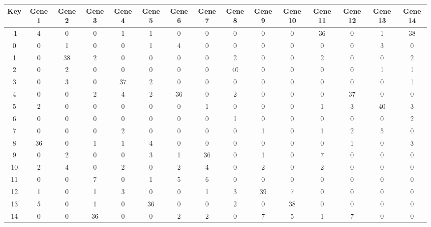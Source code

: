 \begin{tabular}{|c|c|c|c|c|c|c|c|c|c|c|c|c|c|c|}
\hline
Key & Gene 1 & Gene 2 & Gene 3 & Gene 4 & Gene 5 & Gene 6 & Gene 7 & Gene 8 & Gene 9 & Gene 10 & Gene 11 & Gene 12 & Gene 13 & Gene 14 \\
\hline
-1 & 4 & 0 & 0 & 1 & 1 & 0 & 0 & 0 & 0 & 0 & 36 & 0 & 1 & 38 \\
0 & 0 & 1 & 0 & 0 & 1 & 4 & 0 & 0 & 0 & 0 & 0 & 0 & 3 & 0 \\
1 & 0 & 38 & 2 & 0 & 0 & 0 & 0 & 2 & 0 & 0 & 2 & 0 & 0 & 2 \\
2 & 0 & 2 & 0 & 0 & 0 & 0 & 0 & 40 & 0 & 0 & 0 & 0 & 1 & 1 \\
3 & 0 & 3 & 0 & 37 & 2 & 0 & 0 & 0 & 0 & 0 & 0 & 0 & 0 & 1 \\
4 & 0 & 0 & 2 & 4 & 2 & 36 & 0 & 2 & 0 & 0 & 0 & 37 & 0 & 0 \\
5 & 2 & 0 & 0 & 0 & 0 & 0 & 1 & 0 & 0 & 0 & 1 & 3 & 40 & 3 \\
6 & 0 & 0 & 0 & 0 & 0 & 0 & 0 & 1 & 0 & 0 & 0 & 0 & 0 & 2 \\
7 & 0 & 0 & 0 & 2 & 0 & 0 & 0 & 0 & 1 & 0 & 1 & 2 & 5 & 0 \\
8 & 36 & 0 & 1 & 1 & 4 & 0 & 0 & 0 & 0 & 0 & 0 & 1 & 0 & 3 \\
9 & 0 & 2 & 0 & 0 & 3 & 1 & 36 & 0 & 1 & 0 & 7 & 0 & 0 & 0 \\
10 & 2 & 4 & 0 & 2 & 0 & 2 & 4 & 0 & 2 & 0 & 2 & 0 & 0 & 0 \\
11 & 0 & 0 & 7 & 0 & 1 & 5 & 6 & 0 & 0 & 0 & 0 & 0 & 0 & 0 \\
12 & 1 & 0 & 1 & 3 & 0 & 0 & 1 & 3 & 39 & 7 & 0 & 0 & 0 & 0 \\
13 & 5 & 0 & 1 & 0 & 36 & 0 & 0 & 2 & 0 & 38 & 0 & 0 & 0 & 0 \\
14 & 0 & 0 & 36 & 0 & 0 & 2 & 2 & 0 & 7 & 5 & 1 & 7 & 0 & 0 \\
\hline
\end{tabular}